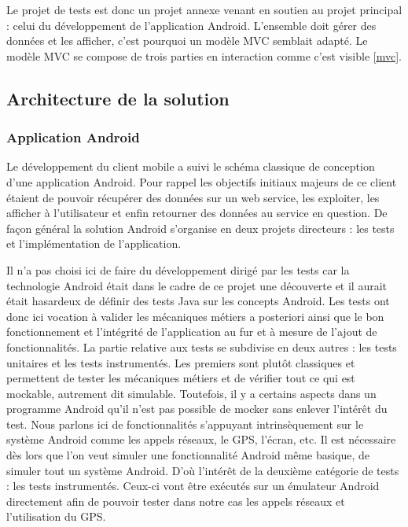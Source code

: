             Le projet de tests est donc un projet annexe venant en soutien au projet principal : celui du développement de l’application Android. L’ensemble doit gérer des données et les afficher, c’est pourquoi un modèle MVC semblait adapté. Le modèle MVC se compose de trois parties en interaction comme c’est visible \ref{mvc}.


    \subsection{Architecture de la solution}

        \subsubsection{Application Android}

        Le développement du client mobile a suivi le schéma classique de conception d’une application Android. Pour rappel les objectifs initiaux majeurs de ce client étaient de pouvoir récupérer des données sur un web service, les exploiter, les afficher à l’utilisateur et enfin retourner des données au service en question. De façon général la solution Android s’organise en deux projets directeurs : les tests et l’implémentation de l’application. 

        Il n’a pas choisi ici de faire du développement dirigé par les tests car la technologie Android était dans le cadre de ce projet une découverte et il aurait était hasardeux de définir des tests Java sur les concepts Android. Les tests ont donc ici vocation à valider les mécaniques métiers a posteriori ainsi que le bon fonctionnement et l’intégrité de l’application au fur et à mesure de l’ajout de fonctionnalités. La partie relative aux tests se subdivise en deux autres : les tests unitaires et les tests instrumentés. Les premiers sont plutôt classiques et permettent de tester les mécaniques métiers et de vérifier tout ce qui est mockable, autrement dit simulable. Toutefois, il y a certains aspects dans un programme Android qu’il n’est pas possible de mocker sans enlever l’intérêt du test. Nous parlons ici de fonctionnalités s’appuyant intrinsèquement sur le système Android comme les appels réseaux, le GPS, l’écran, etc. Il est nécessaire dès lors que l’on veut simuler une fonctionnalité Android même basique, de simuler tout un système Android. D’où l’intérêt de la deuxième catégorie de tests : les tests instrumentés. Ceux-ci vont être exécutés sur un émulateur Android directement afin de pouvoir tester dans notre cas les appels réseaux et l’utilisation du GPS.

